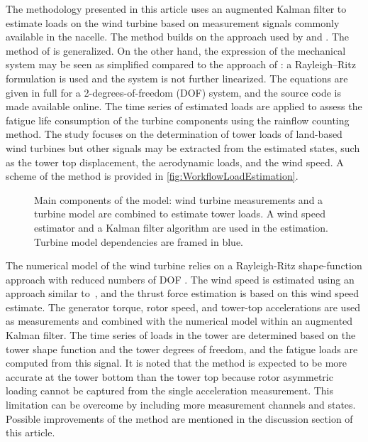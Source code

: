 \documentclass[wes, manuscript]{copernicus}
\begin{document}
The methodology presented in this article uses an augmented Kalman filter \citep{lourens:2012} to estimate loads on the wind turbine based on measurement signals commonly available in the nacelle. 
The method builds on the approach used by \cite{bossanyi:2012} and \cite{lourens:2012}.
The method of \cite{lourens:2012} is generalized. On the other hand, the expression of the mechanical system may be seen as simplified compared to the approach of \cite{bossanyi:2012}: a Rayleigh–Ritz formulation is used and the system is not further linearized. 
The equations are given in full for a 2-degrees-of-freedom (DOF) system, and the source code is made available online.
The time series of estimated loads are applied to assess the fatigue life consumption of the turbine components using the rainflow counting method. 
The study focuses on the determination of tower loads of land-based wind turbines but other signals may be extracted from the estimated states, such as the tower top displacement, the aerodynamic loads, and the wind speed.
A scheme of the method is provided in \autoref{fig:WorkflowLoadEstimation}.
%
\begin{figure}[!htb]%
 \centering%
 \def\svgwidth{1.1\columnwidth}%
 \caption{Main components of the model: wind turbine measurements and a turbine model are combined to estimate tower loads. A wind speed estimator and a Kalman filter algorithm are used in the estimation. Turbine model dependencies are framed in blue.}\label{fig:WorkflowLoadEstimation}%
 \end{figure}%
The numerical model of the wind turbine relies on a Rayleigh-Ritz shape-function approach with reduced numbers of DOF \citep{branlard:2019flex}. 
The wind speed is estimated using an approach similar to~\cite{ostergaard:2007}, and the thrust force estimation is based on this wind speed estimate. 
The generator torque, rotor speed, and tower-top accelerations are used as measurements and combined with the numerical model within an augmented Kalman filter.
%
The time series of loads in the tower are determined based on the tower shape function and the tower degrees of freedom, and the fatigue loads are computed from this signal.
%
It is noted that the method is expected to be more accurate at the tower bottom than the tower top because rotor asymmetric loading cannot be captured from the single acceleration measurement. 
This limitation can be overcome by including more measurement channels and states.
Possible improvements of the method are mentioned in the discussion section of this article.
\end{document}

